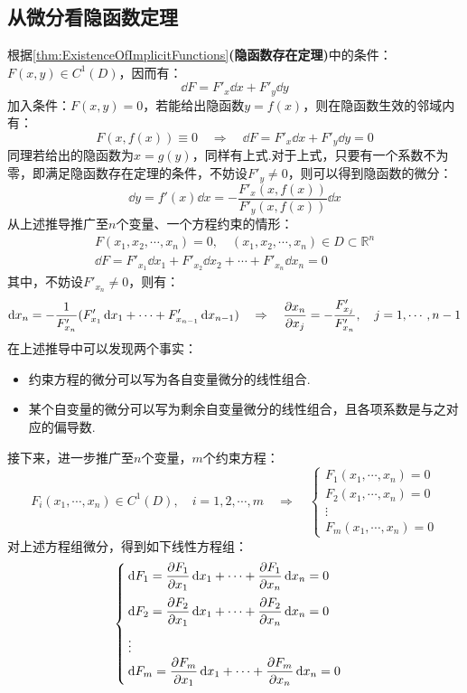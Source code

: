 \subsection{从微分看隐函数定理}
根据\cref{thm:ExistenceOfImplicitFunctions}\textbf{(隐函数存在定理)}中的条件：$F(x,y)\in C^1(D)$，因而有：
\[\dd{F} = F'_x\dd{x} + F'_y\dd{y}\]
加入条件：$F(x,y)=0$，若能给出隐函数$y = f(x)$，则在隐函数生效的邻域内有：
\[F(x,f(x))\equiv 0 \quad\Rightarrow\quad \dd{F} = F'_x\dd{x} + F'_y\dd{y} = 0\] 
同理若给出的隐函数为$x = g(y)$，同样有上式.对于上式，只要有一个系数不为零，即满足隐函数存在定理的条件，不妨设$F'_y \neq 0$，则可以得到隐函数的微分：
\[\dd{y} = f'(x)\dd{x} = -\frac{F'_x(x,f(x))}{F'_y(x,f(x))}\dd{x}\]
从上述推导推广至$n$个变量、一个方程约束的情形：
\begin{gather*}
    F(x_1,x_2,\cdots,x_n) = 0,\quad (x_1,x_2,\cdots,x_n) \in D \subset \mathbb{R}^n\\
    \dd{F} = F'_{x_1}\dd{x_1} + F'_{x_2}\dd{x_2} + \cdots + F'_{x_n}\dd{x_n} = 0
\end{gather*}
其中，不妨设$F'_{x_n} \neq 0$，则有：
\[\dd{x_n} = -\frac{1}{F'_{x_n}}(F'_{x_1}\dd{x_1} + \cdots + F'_{x_{n-1}}\dd{x_{n-1}}) \quad\Rightarrow\quad \pdv{x_n}{x_j} = -\frac{F'_{x_j}}{F'_{x_n}},\quad j = 1,\cdots,n-1\]
在上述推导中可以发现两个事实：
\begin{itemize}
    \item 约束方程的微分可以写为各自变量微分的线性组合.
    \item 某个自变量的微分可以写为剩余自变量微分的线性组合，且各项系数是与之对应的偏导数.
\end{itemize}
接下来，进一步推广至$n$个变量，$m$个约束方程：
\[F_i(x_1,\cdots,x_n) \in C^1(D),\quad i = 1,2,\cdots,m \quad\Rightarrow\quad \begin{cases}
    F_1(x_1,\cdots,x_n) = 0\\
    F_2(x_1,\cdots,x_n) = 0\\
    \vdots\\
    F_m(x_1,\cdots,x_n) = 0
\end{cases}\]
对上述方程组微分，得到如下线性方程组：
\[\begin{cases}
    \displaystyle\dd{F_1} = \pdv{F_1}{x_1}\dd{x_1} + \cdots + \pdv{F_1}{x_n}\dd{x_n} = 0 \\[1em]
    \displaystyle\dd{F_2} = \pdv{F_2}{x_1}\dd{x_1} + \cdots + \pdv{F_2}{x_n}\dd{x_n} = 0 \\[1em]
    \vdots\\
    \displaystyle\dd{F_m} = \pdv{F_m}{x_1}\dd{x_1} + \cdots + \pdv{F_m}{x_n}\dd{x_n} = 0
\end{cases}\]
